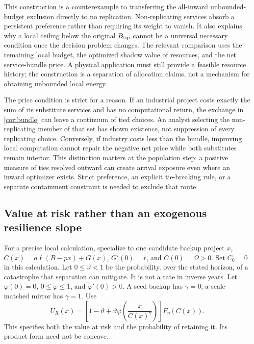 \documentclass[11pt,a4paper]{article}
\theoremstyle{definition}\newtheorem{definition}{Definition}
\begin{document}
This construction is a counterexample to transferring the all-inward
unbounded-budget exclusion directly to no replication. Non-replicating
services absorb a persistent preference rather than requiring its weight
to vanish. It also explains why a local ceiling below the original
$B_{\rm tip}$ cannot be a universal necessary condition once the decision
problem changes. The relevant comparison uses the remaining local budget,
the optimized shadow value of resources, and the net service-bundle price.
A physical application must still provide a feasible resource history;
the construction is a separation of allocation claims, not a mechanism
for obtaining unbounded local energy.

The price condition is strict for a reason. If an industrial project
costs exactly the sum of its substitute services and has no computational
return, the exchange in \cref{cor:bundle} can leave a continuum of tied
choices. An analyst selecting the non-replicating member of that set has
shown existence, not suppression of every replicating choice. Conversely,
if industry costs less than the bundle, improving local computation cannot
repair the negative net price while both substitutes remain interior.
This distinction matters at the population step: a positive measure of
ties resolved outward can create arrival exposure even where an inward
optimizer exists. Strict preference, an explicit tie-breaking rule, or a
separate containment constraint is needed to exclude that route.

\subsection{Value at risk rather than an exogenous resilience slope}
For a precise local calculation, specialize to one candidate backup
project $x$, $C(x)=a\ell(B-px)+G(x)$, $G'(0)=r$, and $C(0)=\Omega>0$.
Set $C_0=0$ in this calculation. Let $0\leq\vartheta<1$ be the
probability, over the stated horizon, of a catastrophe that separation
can mitigate. It is not a rate in inverse years. Let $\varphi(0)=0$,
$0\leq\varphi\leq1$, and $\varphi'(0)>0$. A seed backup has
$\gamma=0$; a scale-matched mirror has $\gamma=1$. Use
\begin{equation}
 U_R(x)=\left[1-\vartheta+\vartheta
       \varphi\!\left(\frac{x}{C(x)^\gamma}\right)\right]F_\eta(C(x)).
 \label{eq:risk-utility}
\end{equation}
This specifies both the value at risk and the probability of retaining it.
Its product form need not be concave.
\end{document}
